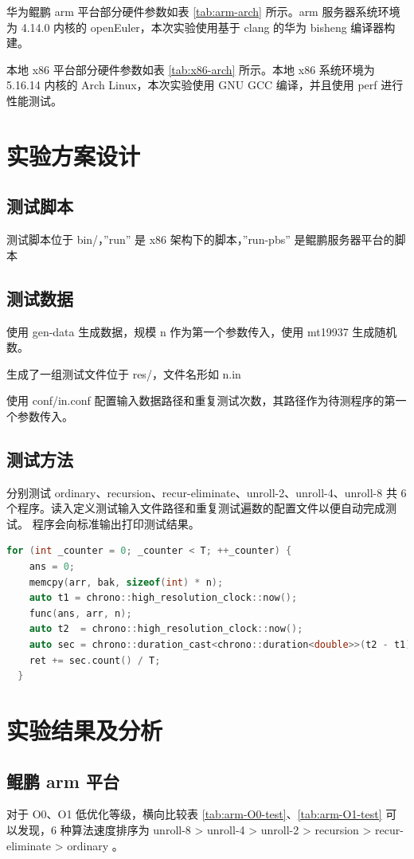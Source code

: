 \documentclass[a4paper]{article}
\begin{document}
华为鲲鹏 arm 平台部分硬件参数如表 \ref{tab:arm-arch} 所示。arm 服务器系统环境为 4.14.0 内核的 openEuler，本次实验使用基于 clang 的华为 bisheng 编译器构建。

本地 x86 平台部分硬件参数如表 \ref{tab:x86-arch} 所示。本地 x86 系统环境为 5.16.14 内核的 Arch Linux，本次实验使用 GNU GCC 编译，并且使用 perf 进行性能测试。

\section{实验方案设计}
\subsection{测试脚本}
测试脚本位于 bin/，''run'' 是 x86 架构下的脚本，''run-pbs'' 是鲲鹏服务器平台的脚本

\subsection{测试数据}
使用 gen-data 生成数据，规模 n 作为第一个参数传入，使用 mt19937 生成随机数。

生成了一组测试文件位于 res/，文件名形如 n.in

使用 conf/in.conf 配置输入数据路径和重复测试次数，其路径作为待测程序的第一个参数传入。

\subsection{测试方法}
分别测试 ordinary、recursion、recur-eliminate、unroll-2、unroll-4、unroll-8 共 6 个程序。读入定义测试输入文件路径和重复测试遍数的配置文件以便自动完成测试。
程序会向标准输出打印测试结果。

\begin{lstlisting}[title=重复测试代码,frame=trbl,language={C++}]
  for (int _counter = 0; _counter < T; ++_counter) {
    ans = 0;
    memcpy(arr, bak, sizeof(int) * n);
    auto t1 = chrono::high_resolution_clock::now();
    func(ans, arr, n);
    auto t2  = chrono::high_resolution_clock::now();
    auto sec = chrono::duration_cast<chrono::duration<double>>(t2 - t1);
    ret += sec.count() / T;
  }
\end{lstlisting}

\section{实验结果及分析}
\subsection{鲲鹏 arm 平台}
对于 O0、O1 低优化等级，横向比较表 \ref{tab:arm-O0-test}、\ref{tab:arm-O1-test} 可以发现，6 种算法速度排序为
unroll-8 > unroll-4 > unroll-2 > recursion > recur-eliminate > ordinary 。
\end{document}
